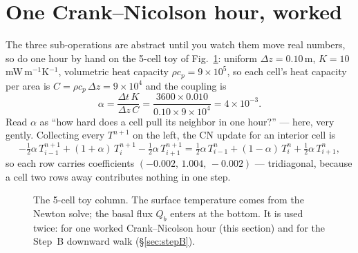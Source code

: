 \documentclass[11pt]{report}
\begin{document}
\section{One Crank--Nicolson hour, worked}\label{sec:cnhour}

The three sub-operations are abstract until you watch them move real numbers, so
do one hour by hand on the 5-cell toy of Fig.~\ref{fig:toy}: uniform
$\Delta z=0.10$\,m, $K=10$\,mW\,m$^{-1}$K$^{-1}$, volumetric heat capacity
$\rho c_p=9\!\times\!10^{5}$, so each cell's heat capacity per area is
$C=\rho c_p\,\Delta z=9\!\times\!10^{4}$ and the coupling is
\[
\alpha=\frac{\Delta t\,K}{\Delta z\,C}=\frac{3600\times0.010}{0.10\times9\!\times\!10^{4}}=4\!\times\!10^{-3}.
\]
Read $\alpha$ as ``how hard does a cell pull its neighbor in one hour?'' --- here,
very gently. Collecting every $T^{n+1}$ on the left, the CN update for an interior
cell is
\[
-\tfrac12\alpha\,T_{i-1}^{n+1}+(1+\alpha)\,T_i^{n+1}-\tfrac12\alpha\,T_{i+1}^{n+1}
=\tfrac12\alpha\,T_{i-1}^{n}+(1-\alpha)\,T_i^{n}+\tfrac12\alpha\,T_{i+1}^{n},
\]
so each row carries coefficients $(-0.002,\,1.004,\,-0.002)$ --- tridiagonal,
because a cell two rows away contributes nothing in one step.

\begin{figure}[htbp]\centering

\caption{The 5-cell toy column. The surface temperature comes from the Newton
solve; the basal flux $Q_b$ enters at the bottom. It is used twice: for one
worked Crank--Nicolson hour (this section) and for the Step~B downward walk
(\S\ref{sec:stepB}).}
\label{fig:toy}
\end{figure}
\end{document}
